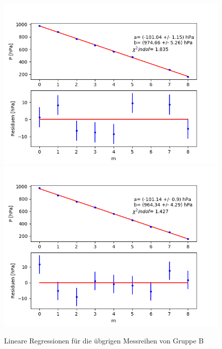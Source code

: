\documentclass[12pt,a4paper]{article}
\begin{document}
\begin{figure}
\includegraphics[scale=0.5]{Bilder/Druck_B_Var2_6.png}
\includegraphics[scale=0.5]{Bilder/Druck_B_Var2_7.png}
\caption{Lineare Regressionen für die übgrigen Messreihen von Gruppe B}
\end{figure}
\end{document}
